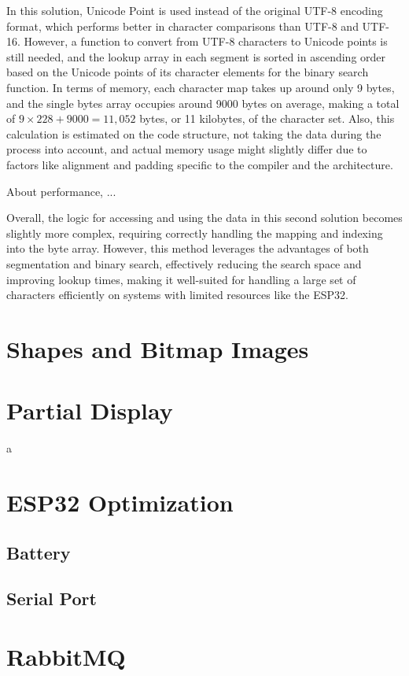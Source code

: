 \documentclass[../Main.tex]{subfiles}
\begin{document}
In this solution, Unicode Point is used instead of the original UTF-8 encoding format, which performs better in character comparisons than UTF-8 and UTF-16. However, a function to convert from UTF-8 characters to Unicode points is still needed, and the lookup array in each segment is sorted in ascending order based on the Unicode points of its character elements for the binary search function. In terms of memory, each character map takes up around only 9 bytes, and the single bytes array occupies around 9000 bytes on average, making a total of \(9\times228+9000=11,052\) bytes, or 11 kilobytes, of the character set. Also, this calculation is estimated on the code structure, not taking the data during the process into account, and actual memory usage might slightly differ due to factors like alignment and padding specific to the compiler and the architecture.

About performance, ...

Overall, the logic for accessing and using the data in this second solution becomes slightly more complex, requiring correctly handling the mapping and indexing into the byte array. However, this method leverages the advantages of both segmentation and binary search, effectively reducing the search space and improving lookup times, making it well-suited for handling a large set of characters efficiently on systems with limited resources like the ESP32.

\section{Shapes and Bitmap Images}
\section{Partial Display}
a
\section{ESP32 Optimization}
\subsection{Battery}
\subsection{Serial Port}

\section{RabbitMQ}
\end{document}
